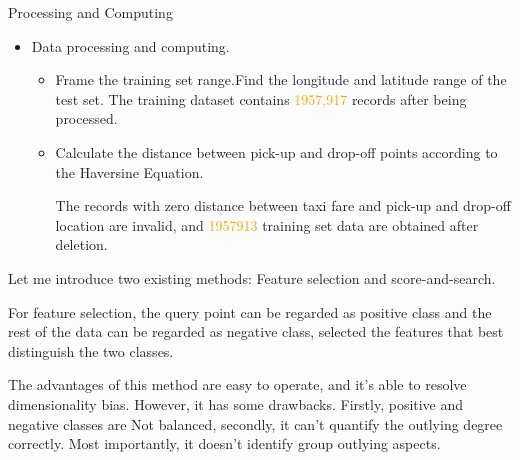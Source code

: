 \documentclass[
 size=14pt,
 paper=smartboard,  %
 mode=present, 		%
 display=slides, 	%
 style=tuliplab,  	%
 pauseslide,
 fleqn,leqno]{powerdot}
\begin{document}
\begin{slide}{Processing and Computing}
  \begin{itemize}
  \item
  Data processing and computing.
  
  
  \begin{itemize}
    \item
    Frame the training set range.Find the longitude and latitude range of the test set. The training dataset contains \textcolor{orange}{1957,917} records after being processed.
    \item
    Calculate the distance between pick-up and drop-off points according to the Haversine Equation.

    The records with zero distance between taxi fare and pick-up and drop-off location are invalid, and \textcolor{orange}{1957913} training set data are obtained after deletion.
  \end{itemize}
  
  \end{itemize}
  
  
  
  \begin{note}
  Let me introduce two existing methods:
  Feature selection and score-and-search.
  
  For feature selection,
  the query point can be regarded as positive class and
  the rest of the data can be regarded as negative class,
  selected the features that best distinguish the two classes.
  
  The advantages of this method are easy to operate,
  and it's able to resolve dimensionality bias.
  However, it has some drawbacks.
  Firstly,
  positive and negative classes are Not balanced,
  secondly,
  it can't quantify the outlying degree correctly.
  Most importantly,
  it doesn't identify group outlying aspects.
  \end{note}
  
  \end{slide}
\end{document}
